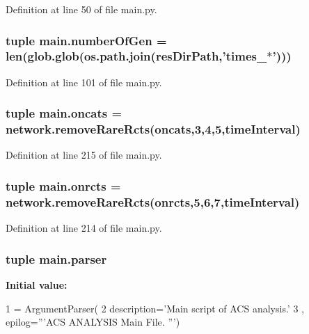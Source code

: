 Definition at line 50 of file main.\+py.

\hypertarget{a00153_aabf82b9e9c2293000a67162becdd440d}{
\subsubsection[{number\+Of\+Gen}]{\setlength{\rightskip}{0pt plus 5cm}tuple main.\+number\+Of\+Gen = len(glob.\+glob(os.\+path.\+join({\bf res\+Dir\+Path},'times\+\_\+$\ast$')))}}\label{a00153_aabf82b9e9c2293000a67162becdd440d}


Definition at line 101 of file main.\+py.

\hypertarget{a00153_ab4d380bc4bfcb970acc39ddf18a73972}{
\subsubsection[{oncats}]{\setlength{\rightskip}{0pt plus 5cm}tuple main.\+oncats = network.\+remove\+Rare\+Rcts(oncats,3,4,5,{\bf time\+Interval})}}\label{a00153_ab4d380bc4bfcb970acc39ddf18a73972}


Definition at line 215 of file main.\+py.

\hypertarget{a00153_ab26ffc3eda5d201a779d705813b06348}{
\subsubsection[{onrcts}]{\setlength{\rightskip}{0pt plus 5cm}tuple main.\+onrcts = network.\+remove\+Rare\+Rcts(onrcts,5,6,7,{\bf time\+Interval})}}\label{a00153_ab26ffc3eda5d201a779d705813b06348}


Definition at line 214 of file main.\+py.

\hypertarget{a00153_a6596d20927a9196bbb33aef704e88297}{
\subsubsection[{parser}]{\setlength{\rightskip}{0pt plus 5cm}tuple main.\+parser}}\label{a00153_a6596d20927a9196bbb33aef704e88297}
{\bfseries Initial value\+:}
\begin{DoxyCode}
1 = ArgumentParser(
2                                 description=\textcolor{stringliteral}{'Main script of ACS analysis.'}
3                                 , epilog=\textcolor{stringliteral}{'''ACS ANALYSIS Main File. '''})
\end{DoxyCode}


